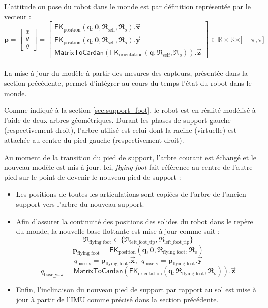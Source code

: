 L'attitude ou pose du robot dans le monde est par définition 
représentée par le vecteur : 
$$
\bm{p} = \begin{bmatrix}x \\ y \\ \theta \end{bmatrix} =
\begin{bmatrix}
\mathsf{FK}_{\text{position}}(\bm{q}, \bm{0}, \mathfrak{R}_{\text{self}}, \mathfrak{R}_{o}).\vec{\bm{x}} \\
\mathsf{FK}_{\text{position}}(\bm{q}, \bm{0}, \mathfrak{R}_{\text{self}}, \mathfrak{R}_{o}).\vec{\bm{y}} \\
\mathsf{MatrixToCardan}(\mathsf{FK}_{\text{orientation}}(\bm{q}, \mathfrak{R}_{\text{self}}, \mathfrak{R}_{o})).\vec{\bm{z}}
\end{bmatrix}
\in \mathbb{R} \times \mathbb{R} \times ]-\pi,\pi]
$$\\

La mise à jour du modèle à partir des mesures des capteurs,
présentée dans la section précédente, permet d'intégrer au cours
du temps l'état du robot dans le monde.

Comme indiqué à la section \ref{sec:support_foot}, le robot 
est en réalité modélisé à l'aide de deux arbres géométriques.
Durant les phases de support gauche (respectivement droit), 
l'arbre utilisé est celui dont la racine (virtuelle) est 
attachée au centre du pied gauche (respectivement droit).

Au moment de la transition du pied de support, l'arbre courant 
est échangé et le nouveau modèle est mis à jour. 
Ici, \textit{flying foot} fait référence au centre de l'autre pied 
sur le point de devenir le nouveau pied de support :
\begin{itemize}
    \item Les positions de toutes les articulations sont copiées 
        de l'arbre de l'ancien support vers l'arbre du nouveau support.
    \item Afin d'assurer la continuité des positions des solides du robot dans 
        le repère du monde, la nouvelle base flottante est mise à jour comme suit :
        $$
        \mathfrak{R}_{\text{flying foot}} \in \{\mathfrak{R}_{\text{left\_foot\_tip}}, \mathfrak{R}_{\text{left\_foot\_tip}}\}
        $$
        $$
        \bm{p}_{\text{flying foot}} = 
        \mathsf{FK}_{\text{position}}(\bm{q}, \bm{0}, \mathfrak{R}_{\text{flying foot}}, \mathfrak{R}_{o})
        $$
        $$
        q_{\text{base\_x}} = \bm{p}_{\text{flying foot}}.\vec{\bm{x}},~~
        q_{\text{base\_y}} = \bm{p}_{\text{flying foot}}.\vec{\bm{y}}
        $$
        $$
        q_{\text{base\_yaw}} = 
        \mathsf{MatrixToCardan}(
        \mathsf{FK}_{\text{orientation}}(\bm{q}, \mathfrak{R}_{\text{flying foot}}, \mathfrak{R}_{o})
        ).\vec{\bm{z}}
        $$
    \item Enfin, l'inclinaison du nouveau pied de support par rapport au sol 
        est mise à jour à partir de l'IMU comme précisé dans la section précédente.
\end{itemize}

